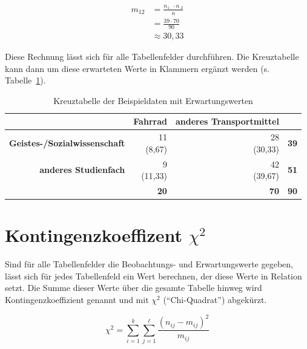 \documentclass[
  11pt,
  ngerman,
  a4paper,
]{report}
\begin{document}
\nopagebreak

\[
\begin{aligned}
m_{12}&=\frac{n_{1\cdot}\cdot n_{\cdot 2}}{n}\\[5pt]
&=\frac{39\cdot 70}{90}\\[4pt]
&\approx 30{,}33
\end{aligned}
\]

Diese Rechnung lässt sich für alle Tabellenfelder durchführen. Die Kreuztabelle kann dann um diese erwarteten Werte in Klammern ergänzt werden (s. Tabelle~\ref{tab:expected}).

\begin{table}

\caption{\label{tab:expected}Kreuztabelle der Beispieldaten mit Erwartungswerten}
\centering
\begin{tabular}[t]{>{}r|r>{}r|>{}r}
\toprule
\textbf{ } & \textbf{Fahrrad} & \textbf{anderes Transportmittel} & \textbf{  }\\
\midrule
\textbf{Geistes-/Sozialwissenschaft} & \makecell[tr]{11\\(8,67)} & \makecell[tr]{28\\(30,33)} & \textbf{39}\\
\textbf{anderes Studienfach} & \makecell[tr]{9\\(11,33)} & \makecell[tr]{42\\(39,67)} & \textbf{51}\\
\midrule
\textbf{\textbf{}} & \textbf{20} & \textbf{70} & \textbf{\textbf{90}}\\
\bottomrule
\end{tabular}
\end{table}

\hypertarget{kontingenzkoeffizent-chi2}{%
\section{\texorpdfstring{Kontingenzkoeffizent \(\chi^2\)}{Kontingenzkoeffizent \textbackslash chi\^{}2}}\label{kontingenzkoeffizent-chi2}}

Sind für alle Tabellenfelder die Beobachtungs- und Erwartungswerte gegeben, lässt sich für jedes Tabellenfeld ein Wert berechnen, der diese Werte in Relation setzt. Die Summe dieser Werte über die gesamte Tabelle hinweg wird Kontingenzkoeffizient genannt und mit \(\chi^2\) (\enquote{Chi-Quadrat}) abgekürzt.

\nopagebreak

\[
\chi^2= \sum_{i=1}^{k}\sum_{j=1}^{\ell}\frac{(n_{ij}-m_{ij})^{2}}{m_{ij}}
\label{eq:chisq}
\]
\end{document}
